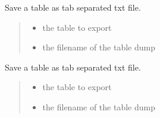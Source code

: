 \documentclass[letterpaper,12pt,english]{sphinxmanual}
\begin{document}
\begin{fulllineitems}
\begin{fulllineitems}
\label{\detokenize{api/networking:cbmpy.CBNetDB.DBTools.dumpTableToTxt}}
\pysigstartsignatures
\pysiglinewithargsret
{}
{\sphinxparamcomma {}}
{}
\pysigstopsignatures
\sphinxAtStartPar
Save a table as tab separated txt file.
\begin{quote}\begin{description}
\begin{itemize}
\item {} 
\sphinxAtStartPar
{} \textendash{} the table to export

\item {} 
\sphinxAtStartPar
{} \textendash{} the filename of the table dump

\end{itemize}

\end{description}\end{quote}

\end{fulllineitems}


\begin{fulllineitems}
\label{\detokenize{api/networking:cbmpy.CBNetDB.DBTools.dumpTableToCSV}}
\pysigstartsignatures
\pysiglinewithargsret
{}
{\sphinxparamcomma {}}
{}
\pysigstopsignatures
\sphinxAtStartPar
Save a table as tab separated txt file.
\begin{quote}\begin{description}
\begin{itemize}
\item {} 
\sphinxAtStartPar
{} \textendash{} the table to export

\item {} 
\sphinxAtStartPar
{} \textendash{} the filename of the table dump

\end{itemize}


\end{description}
\end{quote}
\end{fulllineitems}
\end{fulllineitems}
\end{document}
